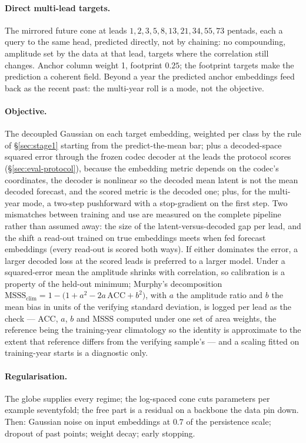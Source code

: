 \documentclass[10pt]{article}
\begin{document}
\paragraph{Direct multi-lead targets.} The mirrored future cone at leads
$1,2,3,5,8,13,21,34,55,73$ pentads, each a query to the same head, predicted
directly, not by chaining: no compounding, amplitude set by the data at
that lead, targets where the correlation still changes. Anchor column weight
1, footprint $0.25$; the footprint targets make the prediction a coherent
field. Beyond a year the predicted anchor embeddings feed back as the recent
past: the multi-year roll is a mode, not the objective.

\paragraph{Objective.} The decoupled Gaussian on each target embedding,
weighted per class by the rule of \S\ref{sec:stage1} starting from the
predict-the-mean bar; plus a decoded-space squared error through the frozen
codec decoder at the leads the protocol scores (\S\ref{sec:eval-protocol}),
because the embedding metric depends on the codec's coordinates, the decoder
is nonlinear so the decoded mean latent is not the mean decoded forecast,
and the scored metric is the decoded one; plus, for the multi-year mode, a
two-step pushforward with a stop-gradient on the first step. Two mismatches
between training and use are measured on the complete pipeline rather than
assumed away: the size of the latent-versus-decoded gap per lead, and the
shift a read-out trained on true embeddings meets when fed forecast
embeddings (every read-out is scored both ways). If either dominates the
error, a larger decoded loss at the scored leads is preferred to a larger
model. Under a squared-error mean the amplitude shrinks with correlation, so
calibration is a property of the held-out minimum; Murphy's decomposition
\cite{murphy}
$\mathrm{MSSS}_{\text{clim}}=1-\big(1+a^2-2a\,\mathrm{ACC}+b^2\big)$, with
$a$ the amplitude ratio and $b$ the mean bias in units of the verifying
standard deviation, is logged per lead as the check --- ACC, $a$, $b$ and
MSSS computed under one set of area weights, the reference being the
training-year climatology so the identity is approximate to the extent that
reference differs from the verifying sample's --- and a scaling fitted on
training-year starts is a diagnostic only.

\paragraph{Regularisation.} The globe supplies every regime; the log-spaced
cone cuts parameters per example seventyfold; the free part is a residual on
a backbone the data pin down. Then: Gaussian noise on input embeddings at
$0.7$ of the persistence scale; dropout of past points; weight decay; early
stopping.
\end{document}
